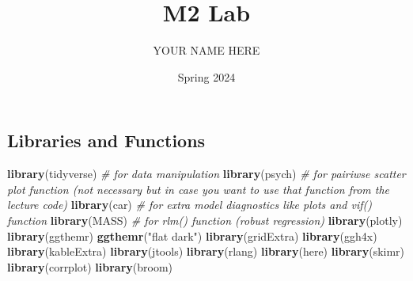 \documentclass[
]{article}
\title{M2 Lab}
\author{YOUR NAME HERE}
\date{Spring 2024}
\newenvironment{Shaded}{\begin{snugshade}}{\end{snugshade}}
\newcommand{\CommentTok}[1]{\textcolor[rgb]{0.56,0.35,0.01}{\textit{#1}}}
\newcommand{\FunctionTok}[1]{\textcolor[rgb]{0.13,0.29,0.53}{\textbf{#1}}}
\newcommand{\NormalTok}[1]{#1}
\newcommand{\StringTok}[1]{\textcolor[rgb]{0.31,0.60,0.02}{#1}}
\begin{document}
\maketitle

\subsection{Libraries and Functions}\label{libraries-and-functions}

\begin{Shaded}
\begin{Highlighting}[]
\FunctionTok{library}\NormalTok{(tidyverse) }\CommentTok{\# for data manipulation}
\FunctionTok{library}\NormalTok{(psych) }\CommentTok{\# for pairiwse scatter plot function (not necessary but in case you want to use that function from the lecture code)}
\FunctionTok{library}\NormalTok{(car) }\CommentTok{\# for extra model diagnostics like plots and vif() function}
\FunctionTok{library}\NormalTok{(MASS) }\CommentTok{\# for rlm() function (robust regression)}
\FunctionTok{library}\NormalTok{(plotly)}
\FunctionTok{library}\NormalTok{(ggthemr)}
\FunctionTok{ggthemr}\NormalTok{(}\StringTok{"flat dark"}\NormalTok{)}
\FunctionTok{library}\NormalTok{(gridExtra)}
\FunctionTok{library}\NormalTok{(ggh4x)}
\FunctionTok{library}\NormalTok{(kableExtra)}
\FunctionTok{library}\NormalTok{(jtools)}
\FunctionTok{library}\NormalTok{(rlang)}
\FunctionTok{library}\NormalTok{(here)}
\FunctionTok{library}\NormalTok{(skimr)}
\FunctionTok{library}\NormalTok{(corrplot)}
\FunctionTok{library}\NormalTok{(broom)}
\end{Highlighting}
\end{Shaded}
\end{document}
